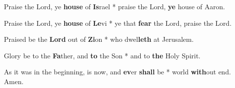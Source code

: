 \begin{multicols}{2}
	Praise the Lord, ye \textbf{house} of \textbf{Is}rael * praise the Lord, \textbf{ye} house of Aaron.
	
	Praise the Lord, ye \textbf{house} of \textbf{Le}vi * ye that \textbf{fear} the Lord, praise the Lord.
	
	Praised be the \textbf{Lord} out of \textbf{Zi}on * who dwel\textbf{leth} at Jerusalem.
	
	Glory be to the \textbf{Fa}ther, and \textbf{to} the Son * and to \textbf{the} Holy Spirit.
	
	As it was in the beginning, is now, and \textbf{ev}er \textbf{shall} be * world \textbf{with}out end. Amen.
\end{multicols}